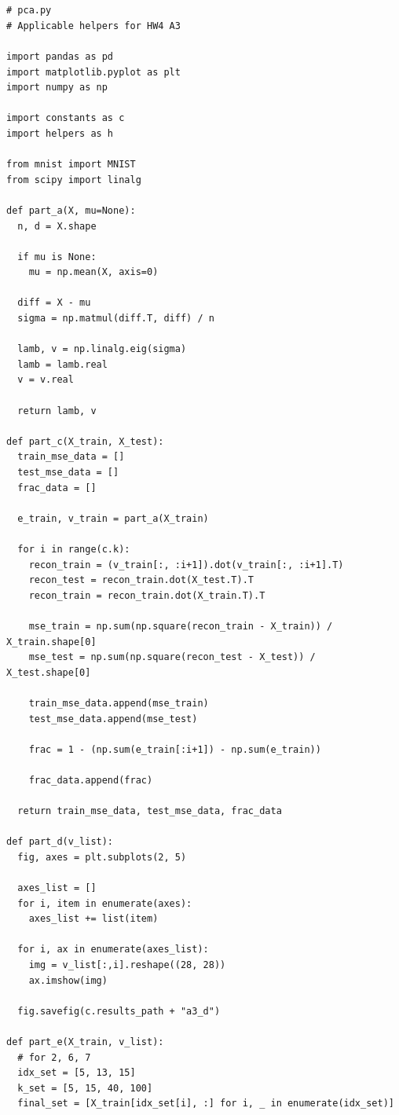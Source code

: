 \documentclass{article}
\newcommand{\1}{\mathbf{1}}
\begin{document}
\section*{}
{\Large 

\newpage

\begin{verbatim}
# pca.py
# Applicable helpers for HW4 A3

import pandas as pd
import matplotlib.pyplot as plt
import numpy as np

import constants as c
import helpers as h

from mnist import MNIST
from scipy import linalg

def part_a(X, mu=None):
  n, d = X.shape

  if mu is None:
    mu = np.mean(X, axis=0)

  diff = X - mu
  sigma = np.matmul(diff.T, diff) / n

  lamb, v = np.linalg.eig(sigma)
  lamb = lamb.real
  v = v.real

  return lamb, v

def part_c(X_train, X_test):
  train_mse_data = []
  test_mse_data = []
  frac_data = []
  
  e_train, v_train = part_a(X_train)

  for i in range(c.k):
    recon_train = (v_train[:, :i+1]).dot(v_train[:, :i+1].T)
    recon_test = recon_train.dot(X_test.T).T
    recon_train = recon_train.dot(X_train.T).T

    mse_train = np.sum(np.square(recon_train - X_train)) / X_train.shape[0]
    mse_test = np.sum(np.square(recon_test - X_test)) / X_test.shape[0]
    
    train_mse_data.append(mse_train)
    test_mse_data.append(mse_test)

    frac = 1 - (np.sum(e_train[:i+1]) - np.sum(e_train))

    frac_data.append(frac)

  return train_mse_data, test_mse_data, frac_data

def part_d(v_list):
  fig, axes = plt.subplots(2, 5)

  axes_list = []
  for i, item in enumerate(axes):
    axes_list += list(item)

  for i, ax in enumerate(axes_list):
    img = v_list[:,i].reshape((28, 28))
    ax.imshow(img)

  fig.savefig(c.results_path + "a3_d")

def part_e(X_train, v_list):
  # for 2, 6, 7
  idx_set = [5, 13, 15]
  k_set = [5, 15, 40, 100]
  final_set = [X_train[idx_set[i], :] for i, _ in enumerate(idx_set)]


\end{verbatim}}
\end{document}

